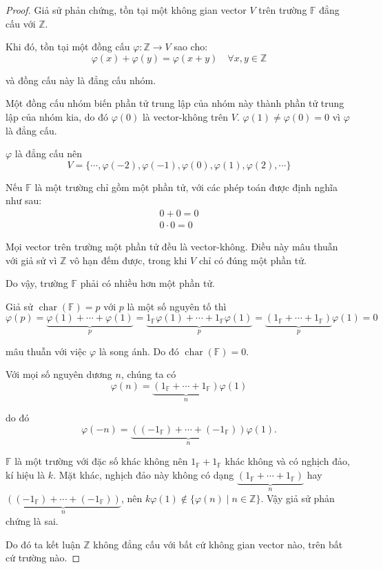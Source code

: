 \begin{proof}
    Giả sử phản chứng, tồn tại một không gian vector $V$ trên trường $\mathbb{F}$ đẳng cấu với $\mathbb{Z}$.

    Khi đó, tồn tại một đồng cấu $\varphi: \mathbb{Z}\rightarrow V$ sao cho:
    \[ \varphi(x) + \varphi(y) = \varphi(x + y)\quad\forall x, y\in\mathbb{Z} \]
    
    và đồng cấu này là đẳng cấu nhóm.
    
    Một đồng cấu nhóm biến phần tử trung lập của nhóm này thành phần tử trung lập của nhóm kia, do đó $\varphi(0)$ là vector-không trên $V$. $\varphi(1)\ne\varphi(0) = 0$ vì $\varphi$ là đẳng cấu.
    
    $\varphi$ là đẳng cấu nên
    \[ V = \{ \cdots, \varphi(-2), \varphi(-1), \varphi(0), \varphi(1), \varphi(2), \cdots \} \]
    
    Nếu $\mathbb{F}$ là một trường chỉ gồm một phần tử, với các phép toán được định nghĩa như sau:
    \begin{align*}
        0 + 0 = 0 \\
        0\cdot 0 = 0
    \end{align*}
    
    Mọi vector trên trường một phần tử đều là vector-không. Điều này mâu thuẫn với giả sử vì $\mathbb{Z}$ vô hạn đếm được, trong khi $V$ chỉ có đúng một phần tử.
    
    Do vậy, trường $\mathbb{F}$ phải có nhiều hơn một phần tử.
    
    Giả sử $\operatorname{char}(\mathbb{F}) = p$ với $p$ là một số nguyên tố thì
    \[
        \varphi(p) = \underbrace{\varphi(1) + \cdots + \varphi(1)}_{p} = \underbrace{1_{\mathbb{F}}\varphi(1) + \cdots + 1_{\mathbb{F}}\varphi(1)}_{p} = \underbrace{(1_{\mathbb{F}} + \cdots + 1_{\mathbb{F}})}_{p}\varphi(1) = 0
    \]
    
    mâu thuẫn với việc $\varphi$ là song ánh. Do đó $\operatorname{char}(\mathbb{F}) = 0$.
    
    Với mọi số nguyên dương $n$, chúng ta có
    \[
        \varphi(n) = \underbrace{(1_{\mathbb{F}} + \cdots + 1_{\mathbb{F}})}_{n}\varphi(1)
    \]
    
    do đó
    \[
        \varphi(-n) = \underbrace{((-1_{\mathbb{F}}) + \cdots + (-1_{\mathbb{F}}))}_{n}\varphi(1).
    \]

    $\mathbb{F}$ là một trường với đặc số khác không nên $1_{\mathbb{F}} + 1_{\mathbb{F}}$ khác không và có nghịch đảo, kí hiệu là $k$. Mặt khác, nghịch đảo này không có dạng $\underbrace{(1_{\mathbb{F}} + \cdots + 1_{\mathbb{F}})}_{n}$ hay $\underbrace{((-1_{\mathbb{F}}) + \cdots + (-1_{\mathbb{F}}))}_{n}$, nên $k\varphi(1)\notin \{ \varphi(n) \mid n\in\mathbb{Z} \}$. Vậy giả sử phản chứng là sai.

    Do đó ta kết luận $\mathbb{Z}$ không đẳng cấu với bất cứ không gian vector nào, trên bất cứ trường nào.
\end{proof}

